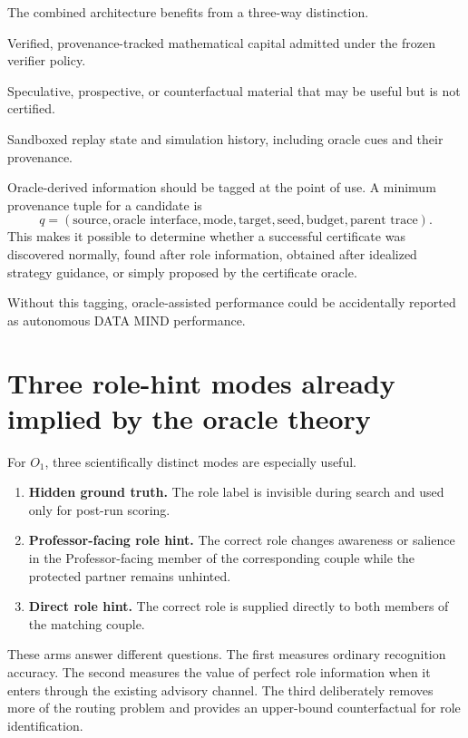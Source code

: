 \documentclass[11pt]{article}
\newcommand{\BANK}{\mathrm{BANK}}
\newcommand{\FBANK}{\mathrm{FUTUREBANK}}
\begin{document}
The combined architecture benefits from a three-way distinction.

\begin{description}[leftmargin=2.5cm,style=nextline]
\item[$\BANK$] Verified, provenance-tracked mathematical capital admitted under the frozen verifier policy.
\item[$\FBANK$] Speculative, prospective, or counterfactual material that may be useful but is not certified.
\item[Dream trace] Sandboxed replay state and simulation history, including oracle cues and their provenance.
\end{description}

Oracle-derived information should be tagged at the point of use. A minimum provenance tuple for a candidate is
\begin{equation}
q=(\text{source},\text{oracle interface},\text{mode},\text{target},\text{seed},\text{budget},\text{parent trace}).
\end{equation}
This makes it possible to determine whether a successful certificate was discovered normally, found after role information, obtained after idealized strategy guidance, or simply proposed by the certificate oracle.

Without this tagging, oracle-assisted performance could be accidentally reported as autonomous DATA MIND performance.

\section{Three role-hint modes already implied by the oracle theory}

For $O_1$, three scientifically distinct modes are especially useful.

\begin{enumerate}[leftmargin=2em]
\item \textbf{Hidden ground truth.} The role label is invisible during search and used only for post-run scoring.
\item \textbf{Professor-facing role hint.} The correct role changes awareness or salience in the Professor-facing member of the corresponding couple while the protected partner remains unhinted.
\item \textbf{Direct role hint.} The correct role is supplied directly to both members of the matching couple.
\end{enumerate}

These arms answer different questions. The first measures ordinary recognition accuracy. The second measures the value of perfect role information when it enters through the existing advisory channel. The third deliberately removes more of the routing problem and provides an upper-bound counterfactual for role identification.
\end{document}
